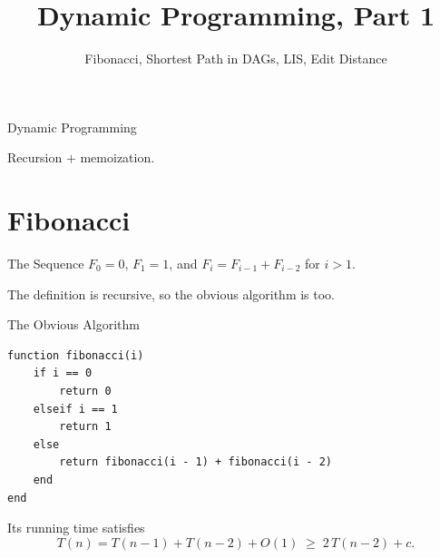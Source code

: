 \documentclass[10pt,aspectratio=169]{beamer}
\title{Dynamic Programming, Part 1}
\subtitle{Fibonacci, Shortest Path in DAGs, LIS, Edit Distance}
\date{}
\author{}
\begin{document}
\maketitle

\begin{frame}{Dynamic Programming}
  \begin{center}
    \Large
    Recursion \; $+$ \; memoization.
  \end{center}



\end{frame}

\section{Fibonacci}

\begin{frame}{The Sequence}
  $F_0 = 0$, \; $F_1 = 1$, \; and $F_i = F_{i-1} + F_{i-2}$ for $i > 1$.

  \bigskip
  \begin{center}
  \end{center}

  \bigskip
  The definition is recursive, so the obvious algorithm is too.
\end{frame}

\begin{frame}[fragile]{The Obvious Algorithm}
  \begin{lstlisting}
function fibonacci(i)
    if i == 0
        return 0
    elseif i == 1
        return 1
    else
        return fibonacci(i - 1) + fibonacci(i - 2)
    end
end
  \end{lstlisting}

  \bigskip
  Its running time satisfies
  \[
    T(n) = T(n-1) + T(n-2) + O(1) \;\ge\; 2\,T(n-2) + c.
  \]
\end{frame}
\end{document}
